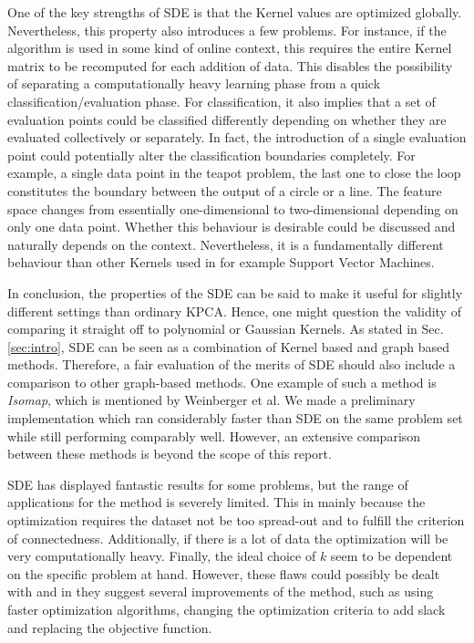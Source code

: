\documentclass[a4paper,12pt]{article}
\begin{document}
One of the key strengths of SDE is that the Kernel values are optimized globally. Nevertheless, this property also introduces a few problems. For instance, if the algorithm is used in some kind of online context, this requires the entire Kernel matrix to be recomputed for each addition of data. This disables the possibility of separating a computationally heavy learning phase from a quick classification/evaluation phase. For classification, it also implies that a set of evaluation points could be classified differently depending on whether they are evaluated collectively or separately. In fact, the introduction of a single evaluation point could potentially alter the classification boundaries completely. For example, a single data point in the teapot problem, the last one to close the loop constitutes the boundary between the output of a circle or a line. The feature space changes from essentially one-dimensional to two-dimensional depending on only one data point. Whether this behaviour is desirable could be discussed and naturally depends on the context. Nevertheless, it is a fundamentally different behaviour than other Kernels used in for example Support Vector Machines.

In conclusion, the properties of the SDE can be said to make it useful for slightly different settings than ordinary KPCA. Hence, one might question the validity of comparing it straight off to polynomial or Gaussian Kernels. As stated in Sec. \ref{sec:intro}, SDE can be seen as a combination of Kernel based and graph based methods. Therefore, a fair evaluation of the merits of SDE should also include a comparison to other graph-based methods. One example of such a method is \emph{Isomap}, which is mentioned by Weinberger et al. We made a preliminary implementation which ran considerably faster than SDE on the same problem set while still performing comparably well. However, an extensive comparison between these methods is beyond the scope of this report.

SDE has displayed fantastic results for some problems, but the range of applications for the method is severely limited. This in mainly because the optimization requires the dataset not be too spread-out and to fulfill the criterion of connectedness. Additionally, if there is a lot of data the optimization will be very computationally heavy. Finally, the ideal choice of $k$ seem to be dependent on the specific problem at hand. However, these flaws could possibly be dealt with and in \cite{weinberger04} they suggest several improvements of the method, such as using faster optimization algorithms, changing the optimization criteria to add slack and replacing the objective function.    



\end{document}
